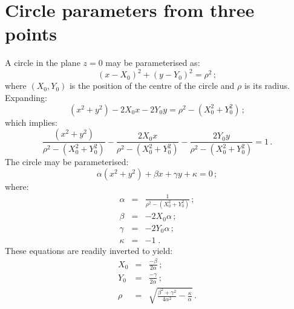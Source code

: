\section{Circle parameters from three points}
\label{App:Crcl3Pnts}

A circle in the plane $z=0$ may be parameterised as:
\begin{equation}
  ( x - X_0 )^2 + ( y - Y_0 )^2 = \rho^2 \, ;
\end{equation}
where $(X_0, Y_0)$ is the position of the centre of the circle and $\rho$
is its radius.
Expanding:
\begin{equation}
  (x^2+y^2) - 2 X_0 x - 2 Y_0 y = \rho^2 -( X_0^2 + Y_0^2 ) \, ;
\end{equation}
which implies:
\begin{equation}
  \frac{(x^2+y^2)}{\rho^2 -( X_0^2 + Y_0^2 )} - 
  \frac{2 X_0 x}{\rho^2 -( X_0^2 + Y_0^2 )}   - 
  \frac{2 Y_0 y}{\rho^2 -( X_0^2 + Y_0^2 )} = 1 \, .
\end{equation}
The circle may be parameterised:
\begin{equation}
  \alpha(x^2+y^2) + \beta x + \gamma y + \kappa = 0 \, ;
  \label{Eq:CrclPrm}
\end{equation}
where:
\begin{eqnarray}
  \alpha & = & \frac{1}{\rho^2 - ( X_0^2 + Y_0^2 )}        \, ;          \\
  \beta  & = & -2 X_0 \alpha                           \, ;          \\
  \gamma & = & -2 Y_0 \alpha                           \, ;          \\
  \kappa & = & -1                                       \; .
\end{eqnarray}
These equations are readily inverted to yield:
\begin{eqnarray}
  X_0 & = & \frac{-\beta}{2 \alpha}                    \, ;
  \label{Eq:Param1}                                                  \\
  Y_0 & = & \frac{-\gamma}{2 \alpha}                   \, ; 
  \label{Eq:Param2}                                                  \\
  \rho   & = & \sqrt{
                  \frac{\beta^2 + \gamma^2}{4 \alpha^2}
                  - \frac{\kappa}{\alpha}
                  } \, .
  \label{Eq:Param3}
\end{eqnarray}

